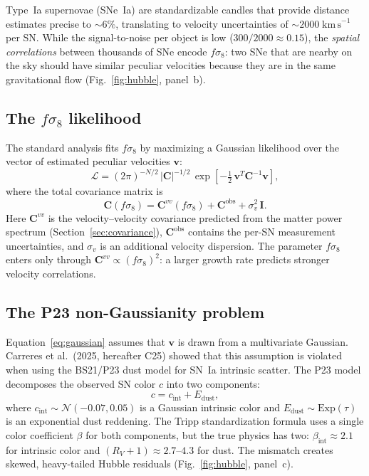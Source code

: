 \documentclass[fleqn,usenatbib]{mnras}
\begin{document}
Type~Ia supernovae (SNe~Ia) are standardizable candles that provide
distance estimates precise to $\sim 6\%$, translating to velocity
uncertainties of $\sim 2000\;\mathrm{km\,s}^{-1}$ per SN. While
the signal-to-noise per object is low ($300/2000 \approx 0.15$),
the \emph{spatial correlations} between thousands of SNe encode
$f\sigma_8$: two SNe that are nearby on the sky should have
similar peculiar velocities because they are in the same
gravitational flow (Fig.~\ref{fig:hubble}, panel~b).

\subsection{The $f\sigma_8$ likelihood}

The standard analysis fits $f\sigma_8$ by maximizing a Gaussian
likelihood over the vector of estimated peculiar velocities
$\bm{v}$:
\begin{equation}
\mathcal{L} = (2\pi)^{-N/2}\,|\bm{C}|^{-1/2}\,
\exp\!\left[-\tfrac{1}{2}\,\bm{v}^T \bm{C}^{-1}\bm{v}\right],
\label{eq:gaussian}
\end{equation}
where the total covariance matrix is
\begin{equation}
\bm{C}(f\sigma_8) = \bm{C}^{vv}(f\sigma_8) +
\bm{C}^{\mathrm{obs}} + \sigma_v^2\,\bm{I}.
\label{eq:cov_total}
\end{equation}
Here $\bm{C}^{vv}$ is the velocity--velocity covariance predicted
from the matter power spectrum (Section~\ref{sec:covariance}),
$\bm{C}^{\mathrm{obs}}$ contains the per-SN measurement
uncertainties, and $\sigma_v$ is an additional velocity dispersion.
The parameter $f\sigma_8$ enters only through $\bm{C}^{vv} \propto
(f\sigma_8)^2$: a larger growth rate predicts stronger velocity
correlations.

\subsection{The P23 non-Gaussianity problem}

Equation~\ref{eq:gaussian} assumes that $\bm{v}$ is drawn from a
multivariate Gaussian. Carreres et al.\ (2025, hereafter C25)
showed that this assumption is violated when using the BS21/P23
dust model for SN~Ia intrinsic scatter. The P23 model decomposes
the observed SN color $c$ into two components:
\begin{equation}
c = c_\mathrm{int} + E_\mathrm{dust},
\label{eq:color_decomp}
\end{equation}
where $c_\mathrm{int} \sim \mathcal{N}(-0.07, 0.05)$ is a Gaussian
intrinsic color and $E_\mathrm{dust} \sim \mathrm{Exp}(\tau)$ is
an exponential dust reddening. The Tripp standardization formula
uses a single color coefficient $\beta$ for both components, but
the true physics has two: $\beta_\mathrm{int} \approx 2.1$ for
intrinsic color and $(R_V + 1) \approx 2.7$--$4.3$ for dust. The
mismatch creates skewed, heavy-tailed Hubble residuals
(Fig.~\ref{fig:hubble}, panel~c).
\end{document}
